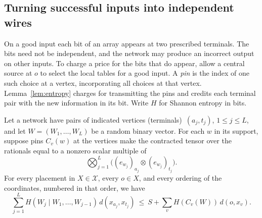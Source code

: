 \subsection{Turning successful inputs into independent wires}

On a good input each bit of an array appears at two prescribed
terminals. The bits need not be independent, and the network may
produce an incorrect output on other inputs. To charge a price for
the bits that do appear, allow a central source at $o$ to select the
local tables for a good input. A \emph{pin} is the index of one such
choice at a vertex, incorporating all choices at that vertex. 
Lemma~\ref{lem:entropy} charges for transmitting the pins and credits
each terminal pair with the new information in its bit. Write $H$ for
Shannon entropy in bits.

\begin{lemma}\label{lem:entropy}
Let a network have pairs of indicated vertices (terminals)~$(a_j,t_j)$, $1\le j\le L$, and let
$W=(W_1,\ldots,W_L)$ be a random binary vector. For each $w$ in its support,
suppose pins $C_v(w)$ at the vertices make the contracted tensor
over the rationals equal to a nonzero scalar multiple of
\[
 \bigotimes_{j=1}^L\bigl((e_{w_j})_{a_j}\otimes(e_{w_j})_{t_j}\bigr).
\]
For every placement in $X\in\mathcal X$, every $o\in X$, and every
ordering of the coordinates, numbered in that order, we have
\begin{equation}\label{eq:entropy-price}
 \sum_{j=1}^{L} H(W_j\mid W_1,\ldots,W_{j-1})\,d(x_{a_j},x_{t_j})
 \ \le\ S+\sum_v H(C_v(W))\,d(o,x_v).
\end{equation}
\end{lemma}

